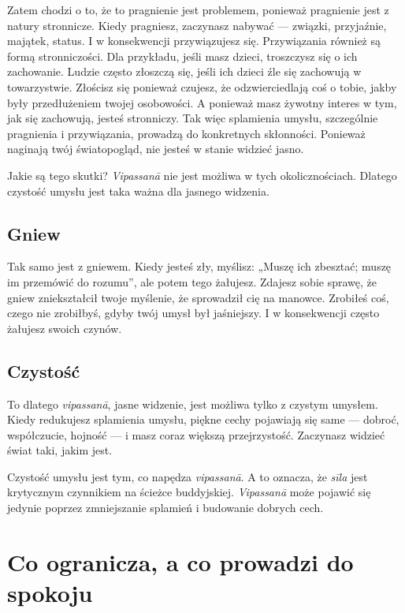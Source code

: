 \documentclass[12pt,openany]{book}
\begin{document}
Zatem chodzi o to, że to pragnienie jest problemem, ponieważ pragnienie jest z natury stronnicze. Kiedy pragniesz, zaczynasz nabywać --- związki, przyjaźnie, majątek, status. I w konsekwencji przywiązujesz się. Przywiązania również są formą stronniczości. Dla przykładu, jeśli masz dzieci, troszczysz się o ich zachowanie. Ludzie często złoszczą się, jeśli ich dzieci źle się zachowują w towarzystwie. Złościsz się ponieważ czujesz, że odzwierciedlają coś o tobie, jakby były przedłużeniem twojej osobowości. A ponieważ masz żywotny interes w tym, jak się zachowują, jesteś stronniczy. Tak więc splamienia umysłu, szczególnie pragnienia i przywiązania, prowadzą do konkretnych skłonności. Ponieważ naginają twój światopogląd, nie jesteś w stanie widzieć jasno.

Jakie są tego skutki? \textit{Vipassanā} nie jest możliwa w tych okolicznościach. Dlatego czystość umysłu jest taka ważna dla jasnego widzenia.

\section*{Gniew}

Tak samo jest z gniewem. Kiedy jesteś zły, myślisz: „Muszę ich zbesztać; muszę im przemówić do rozumu”, ale potem tego żałujesz. Zdajesz sobie sprawę, że gniew zniekształcił twoje myślenie, że sprowadził cię na manowce. Zrobiłeś coś, czego nie zrobiłbyś, gdyby twój umysł był jaśniejszy. I w konsekwencji często żałujesz swoich czynów.

\section*{Czystość}

To dlatego \textit{vipassanā}, jasne widzenie, jest możliwa tylko z czystym umysłem. Kiedy redukujesz splamienia umysłu, piękne cechy pojawiają się same --- dobroć, współczucie, hojność --- i masz coraz większą przejrzystość. Zaczynasz widzieć świat taki, jakim jest.

Czystość umysłu jest tym, co napędza \textit{vipassanā}. A to oznacza, że  \textit{sīla} jest krytycznym czynnikiem na ścieżce buddyjskiej. \textit{Vipassanā} może pojawić się jedynie poprzez zmniejszanie splamień i budowanie dobrych cech.

\chapter*{Co ogranicza, a co prowadzi do spokoju}
\end{document}
